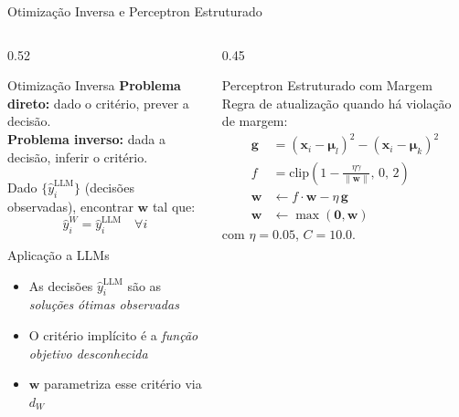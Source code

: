 \documentclass[aspectratio=169, 8pt]{beamer}
\newcommand{\norm}[1]{\left\lVert#1\right\rVert}
\begin{document}
\begin{frame}{Otimização Inversa e Perceptron Estruturado}
  \begin{columns}[T]
    \begin{column}{0.52\textwidth}
      \begin{block}{Otimização Inversa}
        \textbf{Problema direto:} dado o critério, prever a decisão.\\
        \textbf{Problema inverso:} dada a decisão, inferir o critério.

        \vspace{0.3em}
        Dado $\{\hat{y}_i^{\text{LLM}}\}$ (decisões observadas), encontrar
        $\mathbf{w}$ tal que:
        \[
          \hat{y}_i^W = \hat{y}_i^{\text{LLM}} \quad \forall i
        \]
      \end{block}

      \vspace{0.4em}

      \begin{exampleblock}{Aplicação a LLMs}
        \begin{itemize}
          \item As decisões $\hat{y}_i^{\text{LLM}}$ são as \emph{soluções ótimas observadas}
          \item O critério implícito é a \emph{função objetivo desconhecida}
          \item $\mathbf{w}$ parametriza esse critério via $d_W$
        \end{itemize}
      \end{exampleblock}
    \end{column}

    \begin{column}{0.45\textwidth}
      \begin{block}{Perceptron Estruturado com Margem}
        Regra de atualização quando há violação de margem:
        \begin{align*}
          \mathbf{g} &= (\mathbf{x}_i - \boldsymbol{\mu}_l)^2 - (\mathbf{x}_i - \boldsymbol{\mu}_k)^2 \\
          f &= \mathrm{clip}\!\left(1 - \tfrac{\eta\gamma}{\norm{\mathbf{w}}},\, 0,\, 2\right) \\
          \mathbf{w} &\leftarrow f \cdot \mathbf{w} - \eta\,\mathbf{g}\\
          \mathbf{w} &\leftarrow \max(\mathbf{0}, \mathbf{w})
        \end{align*}
        com $\eta = 0.05$, $C = 10.0$.
      \end{block}


\end{column}
\end{columns}
\end{frame}
\end{document}
